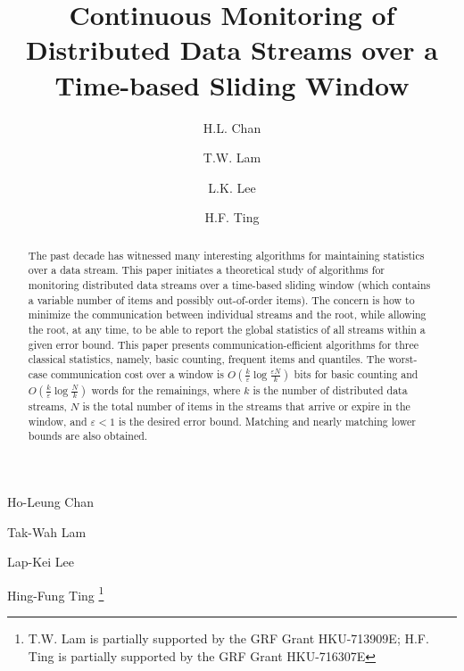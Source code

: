 \documentclass[proceedings]{stacs}
\theoremstyle{definition}\newtheorem{fact}{Fact}
\begin{document}
\title[Continuous Monitoring of Distributed Data Streams over Sliding Window]
{Continuous Monitoring of Distributed Data Streams over a Time-based Sliding Window}

\author[lab1]{H.L. Chan}{Ho-Leung Chan}
\address[lab1]{Department of Computer Science, University of Hong Kong, Hong Kong}  
\author[lab1]{T.W. Lam}{Tak-Wah Lam}
\author[lab2]{L.K. Lee}{Lap-Kei Lee}
\address[lab2]{Max-Planck-Institut f\"ur Informatik, 66123 Saarbr\"ucken, Germany}	
\author[lab1]{H.F. Ting}{Hing-Fung Ting}
\thanks{T.W. Lam is partially supported by the GRF Grant HKU-713909E;
H.F. Ting is partially supported by the GRF Grant HKU-716307E}





\begin{abstract}
\noindent
The past decade has witnessed many interesting algorithms for maintaining
statistics over a data stream.
This paper initiates a theoretical study of algorithms for
monitoring distributed data streams over a time-based sliding window
(which contains a variable number of items
and possibly out-of-order items).  The concern is how to
minimize the communication between individual streams and the root,
while allowing the root, at any time, to be able to report the
global statistics of all streams within a given error bound.  This
paper presents communication-efficient algorithms for three
classical statistics, namely, basic counting,
frequent items and quantiles.
The worst-case communication cost over a window is
$O(\frac{k}{\varepsilon} \log \frac{\varepsilon N}{k})$
bits for basic counting and
$O(\frac{k}{\varepsilon} \log \frac{N}{k})$ words for the remainings, where
$k$ is the number of distributed data streams, $N$ is
the  {total}
 number of items in the streams that arrive or expire in the
window, and
$\varepsilon < 1$ is the desired error bound. Matching and
nearly matching lower bounds are also obtained.
\end{abstract}

\maketitle
\end{document}
